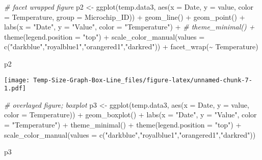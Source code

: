\documentclass[
]{article}
\newenvironment{Shaded}{\begin{snugshade}}{\end{snugshade}}
\newcommand{\AttributeTok}[1]{\textcolor[rgb]{0.77,0.63,0.00}{#1}}
\newcommand{\CommentTok}[1]{\textcolor[rgb]{0.56,0.35,0.01}{\textit{#1}}}
\newcommand{\FunctionTok}[1]{\textcolor[rgb]{0.00,0.00,0.00}{#1}}
\newcommand{\NormalTok}[1]{#1}
\newcommand{\OtherTok}[1]{\textcolor[rgb]{0.56,0.35,0.01}{#1}}
\newcommand{\SpecialCharTok}[1]{\textcolor[rgb]{0.00,0.00,0.00}{#1}}
\newcommand{\StringTok}[1]{\textcolor[rgb]{0.31,0.60,0.02}{#1}}
\begin{document}
\begin{Shaded}
\begin{Highlighting}[]
\CommentTok{\# facet wrapped figure}
\NormalTok{p2 }\OtherTok{\textless{}{-}} \FunctionTok{ggplot}\NormalTok{(temp.data3, }\FunctionTok{aes}\NormalTok{(}\AttributeTok{x =}\NormalTok{ Date, }\AttributeTok{y =}\NormalTok{ value, }\AttributeTok{color =}\NormalTok{ Temperature, }\AttributeTok{group =}\NormalTok{ Microchip\_ID)) }\SpecialCharTok{+}
             \FunctionTok{geom\_line}\NormalTok{() }\SpecialCharTok{+}
             \FunctionTok{geom\_point}\NormalTok{() }\SpecialCharTok{+}
             \FunctionTok{labs}\NormalTok{(}\AttributeTok{x =} \StringTok{"Date"}\NormalTok{, }\AttributeTok{y =} \StringTok{"Value"}\NormalTok{, }\AttributeTok{color =} \StringTok{"Temperature"}\NormalTok{) }\SpecialCharTok{+}
             \CommentTok{\# theme\_minimal() +}
             \FunctionTok{theme}\NormalTok{(}\AttributeTok{legend.position =} \StringTok{"top"}\NormalTok{) }\SpecialCharTok{+} 
             \FunctionTok{scale\_color\_manual}\NormalTok{(}\AttributeTok{values =} \FunctionTok{c}\NormalTok{(}\StringTok{"darkblue"}\NormalTok{,}\StringTok{"royalblue1"}\NormalTok{,}\StringTok{"orangered1"}\NormalTok{,}\StringTok{"darkred"}\NormalTok{)) }\SpecialCharTok{+} \FunctionTok{facet\_wrap}\NormalTok{(}\SpecialCharTok{\textasciitilde{}}\NormalTok{ Temperature)}

\NormalTok{p2}
\end{Highlighting}
\end{Shaded}

\texttt{[image: Temp-Size-Graph-Box-Line\_files/figure-latex/unnamed-chunk-7-1.pdf]}

\begin{Shaded}
\begin{Highlighting}[]
\CommentTok{\# overlayed figure; boxplot}
\NormalTok{p3 }\OtherTok{\textless{}{-}} \FunctionTok{ggplot}\NormalTok{(temp.data3, }\FunctionTok{aes}\NormalTok{(}\AttributeTok{x =}\NormalTok{ Date, }\AttributeTok{y =}\NormalTok{ value, }\AttributeTok{color =}\NormalTok{ Temperature)) }\SpecialCharTok{+}
             \FunctionTok{geom\_boxplot}\NormalTok{() }\SpecialCharTok{+}
             \FunctionTok{labs}\NormalTok{(}\AttributeTok{x =} \StringTok{"Date"}\NormalTok{, }\AttributeTok{y =} \StringTok{"Value"}\NormalTok{, }\AttributeTok{color =} \StringTok{"Temperature"}\NormalTok{) }\SpecialCharTok{+}
             \FunctionTok{theme\_minimal}\NormalTok{() }\SpecialCharTok{+}
             \FunctionTok{theme}\NormalTok{(}\AttributeTok{legend.position =} \StringTok{"top"}\NormalTok{) }\SpecialCharTok{+} 
             \FunctionTok{scale\_color\_manual}\NormalTok{(}\AttributeTok{values =} \FunctionTok{c}\NormalTok{(}\StringTok{"darkblue"}\NormalTok{,}\StringTok{"royalblue1"}\NormalTok{,}\StringTok{"orangered1"}\NormalTok{,}\StringTok{"darkred"}\NormalTok{))}

\NormalTok{p3}
\end{Highlighting}
\end{Shaded}
\end{document}
